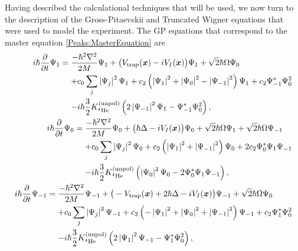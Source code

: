 Having described the calculational techniques that will be used, we now turn to the description of the Gross-Pitaevskii and Truncated Wigner equations that were used to model the experiment. The GP equations that correspond to the master equation \eqref{Peaks:MasterEquation} are
\begin{subequations}
    \label{Peaks:3DGPEquations}
    \begin{align}
        \begin{split}
            i \hbar \frac{\partial }{\partial t}\Psi_1 &= \frac{-\hbar^2 \nabla^2}{2 M} \Psi_1 + \big(V_\text{trap}(\vect{x}) - i V_I(\vect{x})\big)\Psi_1 + \sqrt{2} \hbar \Omega \Psi_0 \\
            & \relphantom{=} + c_0 \sum_j \abs{\Psi_j}^2 \Psi_1 + c_2\left(\abs{\Psi_1}^2 + \abs{\Psi_0}^2 - \abs{\Psi_{-1}}^2 \right) \Psi_1 + c_2 \Psi_{-1}^*\Psi_0^2 \\
            & \relphantom{=} - i \hbar\frac{3}{2}K^\text{(unpol)}_{^{4}\text{He}} \left(2\abs{\Psi_{-1}}^2 \Psi_1 - \Psi_{-1}^* \Psi_0^2\right),
        \end{split}\\
        \begin{split}
            i \hbar \frac{\partial }{\partial t}\Psi_0 &= \frac{-\hbar^2 \nabla^2}{2 M} \Psi_0 + \big(\hbar \Delta - i V_I(\vect{x}) \big)\Psi_0 + \sqrt{2} \hbar \Omega \Psi_1 + \sqrt{2}\hbar\Omega \Psi_{-1} \\
            & \relphantom{=} + c_0 \sum_j \abs{\Psi_j}^2 \Psi_0 + c_2\left(\abs{\Psi_1}^2 + \abs{\Psi_{-1}}^2 \right) \Psi_0 + 2 c_2 \Psi_{0}^*\Psi_1\Psi_{-1} \\
            & \relphantom{=} - i \hbar\frac{3}{2}K^\text{(unpol)}_{^{4}\text{He}} \left(\abs{\Psi_{0}}^2 \Psi_0 - 2\Psi_{0}^* \Psi_1\Psi_{-1}\right),
        \end{split}\\
        \begin{split}
            i \hbar \frac{\partial }{\partial t}\Psi_{-1} &= \frac{-\hbar^2 \nabla^2}{2 M} \Psi_{-1} + \big(-V_\text{trap}(\vect{x}) + 2 \hbar \Delta - i V_I(\vect{x})\big)\Psi_{-1} + \sqrt{2} \hbar \Omega \Psi_0 \\
            & \relphantom{=} + c_0 \sum_j \abs{\Psi_j}^2 \Psi_{-1} + c_2\left(-\abs{\Psi_1}^2 + \abs{\Psi_0}^2 + \abs{\Psi_{-1}}^2 \right) \Psi_{-1} + c_2 \Psi_{1}^*\Psi_0^2 \\
            & \relphantom{=} - i \hbar\frac{3}{2}K^\text{(unpol)}_{^{4}\text{He}} \left(2\abs{\Psi_{1}}^2 \Psi_{-1} - \Psi_{1}^* \Psi_0^2\right),
        \end{split}
    \end{align}
\end{subequations}
